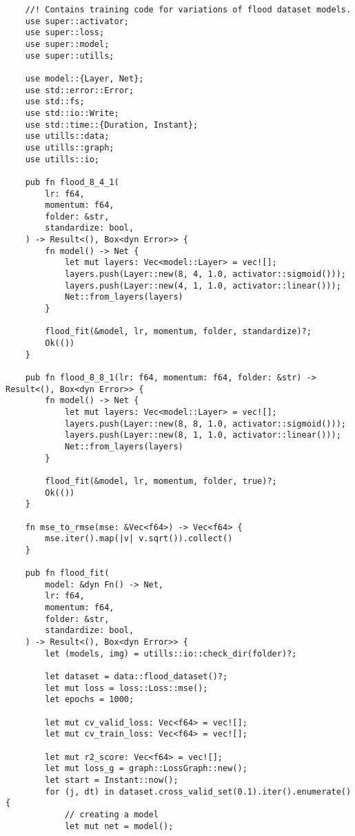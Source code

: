 \begin{verbatim}
    //! Contains training code for variations of flood dataset models.
    use super::activator;
    use super::loss;
    use super::model;
    use super::utills;
    
    use model::{Layer, Net};
    use std::error::Error;
    use std::fs;
    use std::io::Write;
    use std::time::{Duration, Instant};
    use utills::data;
    use utills::graph;
    use utills::io;
    
    pub fn flood_8_4_1(
        lr: f64,
        momentum: f64,
        folder: &str,
        standardize: bool,
    ) -> Result<(), Box<dyn Error>> {
        fn model() -> Net {
            let mut layers: Vec<model::Layer> = vec![];
            layers.push(Layer::new(8, 4, 1.0, activator::sigmoid()));
            layers.push(Layer::new(4, 1, 1.0, activator::linear()));
            Net::from_layers(layers)
        }
    
        flood_fit(&model, lr, momentum, folder, standardize)?;
        Ok(())
    }
    
    pub fn flood_8_8_1(lr: f64, momentum: f64, folder: &str) -> Result<(), Box<dyn Error>> {
        fn model() -> Net {
            let mut layers: Vec<model::Layer> = vec![];
            layers.push(Layer::new(8, 8, 1.0, activator::sigmoid()));
            layers.push(Layer::new(8, 1, 1.0, activator::linear()));
            Net::from_layers(layers)
        }
    
        flood_fit(&model, lr, momentum, folder, true)?;
        Ok(())
    }
    
    fn mse_to_rmse(mse: &Vec<f64>) -> Vec<f64> {
        mse.iter().map(|v| v.sqrt()).collect()
    }
    
    pub fn flood_fit(
        model: &dyn Fn() -> Net,
        lr: f64,
        momentum: f64,
        folder: &str,
        standardize: bool,
    ) -> Result<(), Box<dyn Error>> {
        let (models, img) = utills::io::check_dir(folder)?;
    
        let dataset = data::flood_dataset()?;
        let mut loss = loss::Loss::mse();
        let epochs = 1000;
    
        let mut cv_valid_loss: Vec<f64> = vec![];
        let mut cv_train_loss: Vec<f64> = vec![];
    
        let mut r2_score: Vec<f64> = vec![];
        let mut loss_g = graph::LossGraph::new();
        let start = Instant::now();
        for (j, dt) in dataset.cross_valid_set(0.1).iter().enumerate() {
            // creating a model
            let mut net = model();
    

\end{verbatim}
